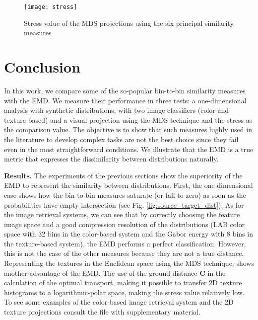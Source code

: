 \begin{figure}[!ht]
    \centering
    \texttt{[image: stress]}
 \caption{Stress value of the MDS projections using the six principal similarity measures}
 \label{fig:stress}
\end{figure}
 
\section{Conclusion}\label{sec:conclusions}

In this work, we compare some of the so-popular bin-to-bin similarity measures with the EMD. We measure their performance in three tests: a one-dimensional analysis with synthetic distributions, with two image classifiers (color and texture-based) and a visual projection using the MDS technique and the stress as the comparison value. The objective is to show that such measures highly used in the literature to develop complex tasks are not the best choice since they fail even in the most straightforward conditions. We illustrate that the EMD is a true metric \citep{Peyre.Cuturi:arXiv:2018} that expresses the dissimilarity between distributions naturally.

\textbf{Results.}
The experiments of the previous sections show the superiority of the EMD to represent the similarity between distributions. First, the one-dimensional case shows how the bin-to-bin measures saturate (or fall to zero) as soon as the probabilities have empty intersection (see Fig. \ref{fig:source_target_dist}). As for the image retrieval systems, we can see that by correctly choosing the feature image space and a good compression resolution of the distributions (LAB color space with 32 bins in the color-based system and the Gabor energy with 8 bins in the texture-based system), the EMD performs a perfect classification. However, this is not the case of the other measures because they are not a true distance. Representing the textures in the Euclidean space using the MDS technique, shows another advantage of the EMD. The use of the ground distance $\textbf{C}$ in the calculation of the optimal transport, making it possible to transfer 2D texture histograms to a logarithmic-polar space, making the stress value relatively low. To see some examples of the color-based image retrieval system and the 2D texture projections consult the file with supplementary material.


